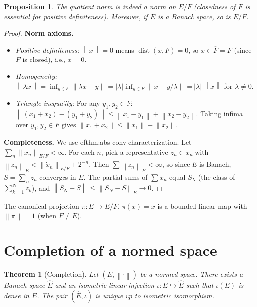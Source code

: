 \documentclass[a4paper,12pt]{book}
\DeclareMathOperator{\dist}{dist}
\newcommand{\norm}[1]{\left\| #1 \right\|}
\newcommand{\abs}[1]{\left| #1 \right|}
\theoremstyle{definition}
\theoremstyle{plain}
\newtheorem{theorem}[definition]{Theorem}
\newtheorem{proposition}[definition]{Proposition}
\theoremstyle{remark}
\begin{document}
\begin{proposition}
\label{prop:quotient-norm-is-norm}
The quotient norm is indeed a norm on $E/F$ (closedness of $F$ is essential
for positive definiteness).  Moreover, if $E$ is a Banach space, so is $E/F$.
\end{proposition}

\begin{proof}
\textbf{Norm axioms.}
\begin{itemize}
  \item \emph{Positive definiteness:}
    $\norm{\dot x}=0$ means $\dist(x,F)=0$, so $x\in\overline{F}=F$
    (since $F$ is closed), i.e., $\dot x = \dot 0$.
  \item \emph{Homogeneity:}
    $\norm{\lambda\dot x}=\inf_{y\in F}\norm{\lambda x-y}
    =\abs{\lambda}\inf_{y\in F}\norm{x-y/\lambda}
    =\abs{\lambda}\,\norm{\dot x}$ for $\lambda\ne 0$.
  \item \emph{Triangle inequality:}
    For any $y_1,y_2\in F$:
    $\norm{(x_1+x_2)-(y_1+y_2)}\le\norm{x_1-y_1}+\norm{x_2-y_2}$.
    Taking infima over $y_1,y_2\in F$ gives
    $\norm{\dot x_1+\dot x_2}\le\norm{\dot x_1}+\norm{\dot x_2}$.
\end{itemize}

\textbf{Completeness.}  We use 
ef{thm:abs-conv-characterization}.
Let $\sum_n\norm{\dot x_n}_{E/F}<\infty$.  For each $n$, pick a
representative $z_n\in\dot x_n$ with $\norm{z_n}_E<\norm{\dot x_n}_{E/F}+2^{-n}$.
Then $\sum\norm{z_n}_E<\infty$, so since $E$ is Banach,
$S=\sum_n z_n$ converges in $E$.  The partial sums of $\sum\dot x_n$
equal $\dot{S}_N$ (the class of $\sum_{k=1}^N z_k$), and
$\norm{\dot{S}_N-\dot{S}}\le\norm{S_N-S}_E\to 0$.
\end{proof}

The canonical projection
$\pi:E\to E/F$, $\pi(x)=\dot x$ is a bounded linear map with
$\norm{\pi}=1$ (when $F\ne E$).

\section{Completion of a normed space}
\label{sec:completion}

\begin{theorem}[Completion]
\label{thm:completion}
Let $(E,\norm{\cdot})$ be a normed space.  There exists a Banach space
$\widehat{E}$ and an isometric linear injection $\iota:E\hookrightarrow\widehat{E}$
such that $\iota(E)$ is dense in $\widehat{E}$.  The pair
$(\widehat{E},\iota)$ is unique up to isometric isomorphism.
\end{theorem}
\end{document}
